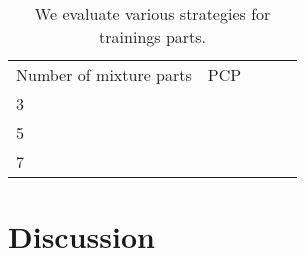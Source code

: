 \begin{table}[h]
\centering
\begin{tabular}{|l|l|l|ll}
Number of mixture parts & PCP  &  \\ \cline{1-2}
3     &     &          &  \\ \cline{1-2}
5     &     &          &  \\ \cline{1-2}
7     &     &          &  \\ \cline{1-2}
\end{tabular}
\caption{We evaluate various strategies for trainings parts. }
\end{table}

\section{Discussion}

